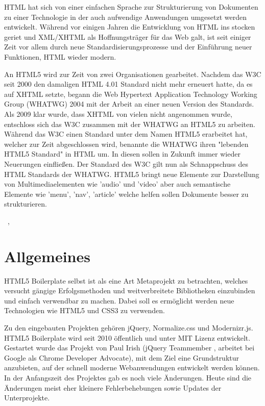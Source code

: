 \documentclass[12pt,journal,compsoc]{IEEEtran}
\begin{document}
HTML hat sich von einer einfachen Sprache zur Strukturierung von Dokumenten zu einer Technologie in der auch aufwendige Anwendungen umgesetzt werden 
entwickelt. 
Während vor einigen Jahren die Entwicklung von HTML ins stocken geriet und XML/XHTML als Hoffnungsträger für das Web galt, ist seit einiger Zeit
vor allem durch neue Standardisierungsprozesse und der Einführung neuer Funktionen, HTML wieder modern.

An HTML5 wird zur Zeit von zwei Organisationen gearbeitet.
Nachdem das W3C seit 2000 den damaligen HTML 4.01 Standard nicht mehr erneuert hatte, da es auf XHTML setzte,
begann die Web Hypertext Application Technology Working Group (WHATWG) 2004 mit der Arbeit an einer neuen Version des Standards.
Als 2009 klar wurde, dass XHTML von vielen nicht angenommen wurde,
entschloss sich das W3C zusammen mit der WHATWG an HTML5 zu arbeiten.
Während das W3C einen Standard unter dem Namen HTML5
erarbeitet hat, welcher zur Zeit abgeschlossen wird, benannte die
WHATWG ihren "lebenden HTML5 Standard" in HTML um.
In diesen sollen in Zukunft immer wieder Neuerungen einfließen.
Der Standard des W3C gilt nun als Schnappschuss des HTML Standards der WHATWG. \cite{xhtml}
HTML5 bringt neue Elemente zur Darstellung von Multimediaelementen wie 'audio' und 'video' aber auch semantische Elemente wie 'menu', 'nav', 'article' welche helfen sollen Dokumente besser zu strukturieren.
 


\hfill{\the\day~\Monat, \the\year  }

\section{Allgemeines}
HTML5 Boilerplate selbst ist als eine Art Metaprojekt zu betrachten, welches versucht gängige Erfolgsmethoden und weitverbreitete Bibliotheken einzubinden und einfach verwendbar zu machen.
Dabei soll es ermöglicht werden neue Technologien wie HTML5 und CSS3 zu verwenden.

Zu den eingebauten Projekten gehören jQuery, Normalize.css und Modernizr.js.
HTML5 Boilerplate wird seit 2010 öffentlich und unter MIT Lizenz \cite{MIT} entwickelt. Gestartet  wurde das Projekt von Paul Irish (jQuery Teammember
, arbeitet bei Google als Chrome Developer Advocate), mit dem Ziel eine Grundstruktur anzubieten,
auf der schnell moderne Webanwendungen entwickelt werden können. In der Anfangszeit des Projektes gab es noch viele Änderungen.
Heute sind die Änderungen meist eher kleinere Fehlerbehebungen sowie Updates der Unterprojekte. 
\end{document}
